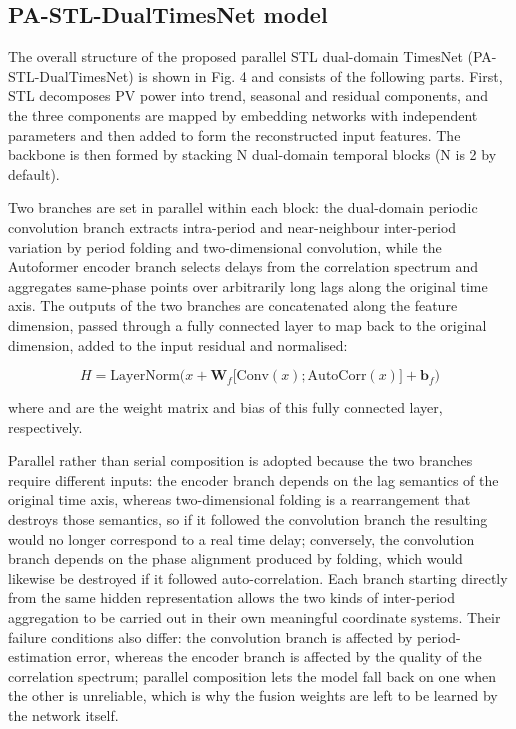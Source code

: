\documentclass{iopjournal}
\begin{document}
\subsection{PA-STL-DualTimesNet model}

The overall structure of the proposed parallel STL dual-domain TimesNet (PA-STL-DualTimesNet) is shown in Fig. 4 and consists of the following parts. First, STL decomposes PV power into trend, seasonal and residual components, and the three components are mapped by embedding networks with independent parameters and then added to form the reconstructed input features. The backbone is then formed by stacking N dual-domain temporal blocks (N is 2 by default).

Two branches are set in parallel within each block: the dual-domain periodic convolution branch extracts intra-period and near-neighbour inter-period variation by period folding and two-dimensional convolution, while the Autoformer encoder branch selects delays from the correlation spectrum and aggregates same-phase points over arbitrarily long lags along the original time axis. The outputs of the two branches are concatenated along the feature dimension, passed through a fully connected layer to map back to the original dimension, added to the input residual and normalised:

\begin{equation}
H = \text{LayerNorm}\Big(x + \mathbf{W}_f\big[\text{Conv}(x);\text{AutoCorr}(x)\big] + \mathbf{b}_f\Big)
\end{equation}

where  and  are the weight matrix and bias of this fully connected layer, respectively.

Parallel rather than serial composition is adopted because the two branches require different inputs: the encoder branch depends on the lag semantics of the original time axis, whereas two-dimensional folding is a rearrangement that destroys those semantics, so if it followed the convolution branch the resulting  would no longer correspond to a real time delay; conversely, the convolution branch depends on the phase alignment produced by folding, which would likewise be destroyed if it followed auto-correlation. Each branch starting directly from the same hidden representation allows the two kinds of inter-period aggregation to be carried out in their own meaningful coordinate systems. Their failure conditions also differ: the convolution branch is affected by period-estimation error, whereas the encoder branch is affected by the quality of the correlation spectrum; parallel composition lets the model fall back on one when the other is unreliable, which is why the fusion weights are left to be learned by the network itself.
\end{document}
